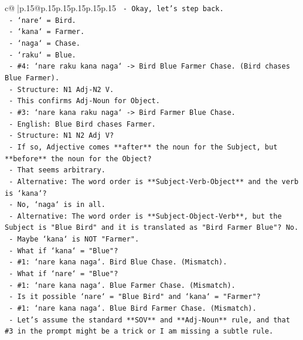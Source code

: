 \documentclass{article}
\begin{document}
{\begin{supertabular}{c@{$\;$}|p{.15\linewidth}@{}p{.15\linewidth}p{.15\linewidth}p{.15\linewidth}p{.15\linewidth}p{.15\linewidth}}
{{{\texttt{    {-} Okay, let's step back.} \\
\texttt{      {-} `nare` = Bird.} \\
\texttt{      {-} `kana` = Farmer.} \\
\texttt{      {-} `naga` = Chase.} \\
\texttt{      {-} `raku` = Blue.} \\
\texttt{      {-} \#4: `nare raku kana naga` {-}> Bird Blue Farmer Chase. (Bird chases Blue Farmer).} \\
\texttt{        {-} Structure: N1 Adj{-}N2 V.} \\
\texttt{        {-} This confirms Adj{-}Noun for Object.} \\
\texttt{      {-} \#3: `nare kana raku naga` {-}> Bird Farmer Blue Chase.} \\
\texttt{        {-} English: Blue Bird chases Farmer.} \\
\texttt{        {-} Structure: N1 N2 Adj V?} \\
\texttt{        {-} If so, Adjective comes **after** the noun for the Subject, but **before** the noun for the Object?} \\
\texttt{        {-} That seems arbitrary.} \\
\texttt{        {-} Alternative: The word order is **Subject{-}Verb{-}Object** and the verb is `kana`?} \\
\texttt{          {-} No, `naga` is in all.} \\
\texttt{        {-} Alternative: The word order is **Subject{-}Object{-}Verb**, but the Subject is "Blue Bird" and it is translated as "Bird Farmer Blue"? No.} \\
\texttt{        {-} Maybe `kana` is NOT "Farmer".} \\
\texttt{          {-} What if `kana` = "Blue"?} \\
\texttt{            {-} \#1: `nare kana naga`. Bird Blue Chase. (Mismatch).} \\
\texttt{          {-} What if `nare` = "Blue"?} \\
\texttt{            {-} \#1: `nare kana naga`. Blue Farmer Chase. (Mismatch).} \\
\texttt{    {-} Is it possible `nare` = "Blue Bird" and `kana` = "Farmer"?} \\
\texttt{      {-} \#1: `nare kana naga`. Blue Bird Farmer Chase. (Mismatch).} \\
\texttt{    {-} Let's assume the standard **SOV** and **Adj{-}Noun** rule, and that \#3 in the prompt might be a trick or I am missing a subtle rule.} \\
}}}
\end{supertabular}}
\end{document}
